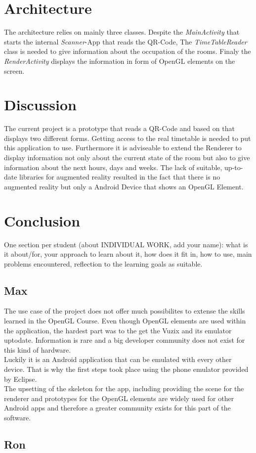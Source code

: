 \documentclass[]{article}
\begin{document}
\section{Architecture}
The architecture relies on mainly three classes. Despite the \emph{MainActivity} that starts the internal \emph{Scanner}-App that reads the QR-Code, The \emph{TimeTableReader} class is needed to give information about the occupation of the rooms. Finaly the \emph{RenderActivity} displays the information in form of OpenGL elements on the screen.   
\section{Discussion}
The current project is a prototype that reads a QR-Code and based on that displays two different forms. Getting access to the real timetable is needed to put this application to use. Furthermore it is adviseable to extend the Renderer to display information not only about the current state of the room but also to give information about the next hours, days and weeks.\newline
The lack of suitable, up-to-date libraries for augmented reality resulted in the fact that there is no augmented reality but only a Android Device that shows an OpenGL Element.  
\section{Conclusion}
One section per student (about INDIVIDUAL WORK, add your name): what is it about/for,
your approach to learn about it, how does it fit in, how to use, main problems encountered,
reflection to the learning goals as suitable.
\subsection{Max}
The use case of the project does not offer much possibilites to extense the skills learned in the OpenGL Course. Even though OpenGL elements are used within the application, the hardest part was to the get the Vuzix and its emulator uptodate. Information is rare and a big developer community does not exist for this kind of hardware. \\
Luckily it is an Android application that can be emulated with every other device. That is why the first steps took place using the phone emulator provided by Eclipse. \\
The upsetting of the skeleton for the app, including providing the scene for the renderer and prototypes for the OpenGL elements are widely used for other Android apps and therefore a greater community exists for this part of the software. 
\subsection{Ron}
\end{document}
